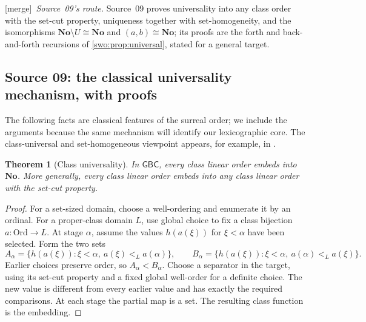 \documentclass[11pt]{article}
\newtheorem{theorem}{Theorem}[section]
\theoremstyle{definition}
\theoremstyle{remark}
\newcommand{\No}{\mathbf{No}}
\newcommand{\Ord}{\mathrm{Ord}}
\newcommand{\GBC}{\mathsf{GBC}}
\newcommand{\merge}{\textsf{[merge]}}
\begin{document}

\merge\ \emph{Source~09's route.} Source~09 proves universality into any class
order with the set-cut property, uniqueness together with set-homogeneity,
and the isomorphisms $\No\setminus U\cong\No$ and $(a,b)\cong\No$; its proofs
are the forth and back-and-forth recursions of \cref{swo:prop:universal},
stated for a general target.

\subsection{Source 09: the classical universality mechanism, with proofs}
\label{swo:ec:sec:universality}
The following facts are classical features of the surreal order; we
include the arguments because the same mechanism will identify our
lexicographic core. The class-universal and set-homogeneous viewpoint
appears, for example, in \cite{RochaRangelMariano}.

\begin{theorem}[Class universality]\label{swo:ec:thm:class-universal}
In $\GBC$, every class linear order embeds into $\No$. More generally,
every class linear order embeds into any class linear order with the
set-cut property.
\end{theorem}
\begin{proof}
For a set-sized domain, choose a well-ordering and enumerate it by an
ordinal. For a proper-class domain $L$, use global choice to fix a class
bijection $a:\Ord\to L$. At stage $\alpha$, assume the values $h(a(\xi))$
for $\xi<\alpha$ have been selected. Form the two sets
\[
 A_\alpha=\{h(a(\xi)):\xi<\alpha,
                         \ a(\xi)<_L a(\alpha)\},
 \qquad
 B_\alpha=\{h(a(\xi)):\xi<\alpha,
                         \ a(\alpha)<_L a(\xi)\}.
\]
Earlier choices preserve order, so $A_\alpha<B_\alpha$. Choose a separator
in the target, using its set-cut property and a fixed global well-order
for a definite choice. The new value is different from every earlier
value and has exactly the required comparisons. At each stage the
partial map is a set. The resulting class function is the embedding.
\end{proof}
\end{document}
